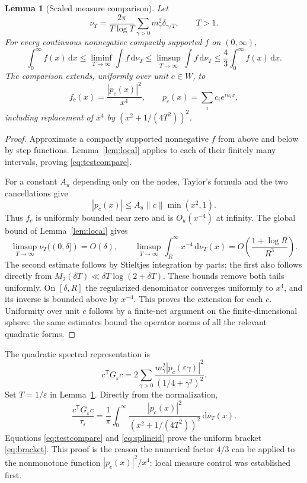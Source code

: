 \documentclass[11pt]{article}
\newtheorem{lemma}[theorem]{Lemma}
\theoremstyle{definition}\newtheorem{definition}[theorem]{Definition}
\theoremstyle{remark}\newtheorem{remark}[theorem]{Remark}
\newcommand{\dd}{\,\mathrm d}
\newcommand{\eps}{\varepsilon}
\newcommand{\tr}{\mathsf T}
\newcommand{\tauE}{\tau_\eps}
\begin{document}
\begin{lemma}[Scaled measure comparison]\label{lem:measure}
Let
\[
 \nu_T=\frac{2\pi}{T\log T}
       \sum_{\gamma>0}m_\gamma^2\delta_{\gamma/T},\qquad T>1.
\]
For every continuous nonnegative compactly supported $f$ on $(0,\infty)$,
\begin{equation}\label{eq:testcompare}
 \int_0^\infty f(x)\dd x
 \le\liminf_{T\to\infty}\int f\dd\nu_T
 \le\limsup_{T\to\infty}\int f\dd\nu_T
 \le\frac43\int_0^\infty f(x)\dd x.
\end{equation}
The comparison extends, uniformly over unit $c\in W$, to
\[
 f_c(x)=\frac{|p_c(x)|^2}{x^4},\qquad
 p_c(x)=\sum_i c_i e^{iu_i x},
\]
including replacement of $x^4$ by $(x^2+1/(4T^2))^2$.
\end{lemma}
\begin{proof}
Approximate a compactly supported nonnegative $f$ from above and below
by step functions. Lemma~\ref{lem:local} applies to each of their finitely
many intervals, proving \eqref{eq:testcompare}.

For a constant $A_u$ depending only on the nodes, Taylor's formula and
the two cancellations give
\[
 |p_c(x)|\le A_u\|c\|\min(x^2,1).
\]
Thus $f_c$ is uniformly bounded near zero and is $O_u(x^{-4})$ at
infinity. The global bound of Lemma~\ref{lem:local} gives
\[
 \limsup_{T\to\infty}\nu_T((0,\delta])=O(\delta),\qquad
 \limsup_{T\to\infty}\int_R^\infty x^{-4}\dd\nu_T(x)
       =O\!\left(\frac{1+\log R}{R^3}\right).
\]
The second estimate follows by Stieltjes integration by parts; the
first also follows directly from $M_2(\delta T)\ll\delta T\log(2+\delta T)$.
These bounds remove both tails uniformly. On $[\delta,R]$ the
regularized denominator converges uniformly to $x^4$, and its inverse
is bounded above by $x^{-4}$. This proves the extension for each $c$.
Uniformity over unit $c$ follows by a finite-net argument on the
finite-dimensional sphere: the same estimates bound the operator norms
of all the relevant quadratic forms.
\end{proof}

The quadratic spectral representation is
\begin{equation}\label{eq:quadratic}
 c^\tr G_\eps c
 =2\sum_{\gamma>0}
 \frac{m_\gamma^2|p_c(\eps\gamma)|^2}{(1/4+\gamma^2)^2}.
\end{equation}
Set $T=1/\eps$ in Lemma~\ref{lem:measure}. Directly from the normalization,
\begin{equation}\label{eq:scaled}
 \frac{c^\tr G_\eps c}{\tauE}
 =\frac1\pi\int_0^\infty
 \frac{|p_c(x)|^2}{(x^2+1/(4T^2))^2}\dd\nu_T(x).
\end{equation}
Equations \eqref{eq:testcompare} and \eqref{eq:splineid} prove the
uniform bracket \eqref{eq:bracket}. This proof is the reason the
numerical factor $4/3$ can be applied to the nonmonotone function
$|p_c(x)|^2/x^4$: local measure control was established first.
\end{document}

